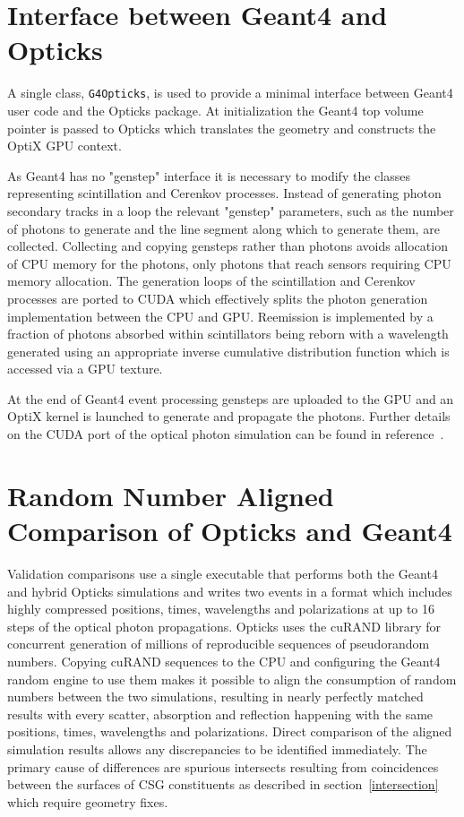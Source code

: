 \documentclass{webofc}
\begin{document}
\section{Interface between Geant4 and Opticks}
\label{simulation}
%
A single class, {\tt G4Opticks}, is used to provide a 
minimal interface between Geant4 user code and 
the Opticks package. 
At initialization the Geant4 top volume pointer is
passed to Opticks which translates the geometry and constructs 
the OptiX GPU context.

As Geant4 has no "genstep" interface it is necessary to modify the 
classes representing scintillation and Cerenkov processes.
Instead of generating photon secondary tracks in a loop the relevant "genstep" parameters, 
such as the number of photons to generate and the line segment along which to generate them, 
are collected. Collecting and copying gensteps rather than photons avoids allocation of CPU memory
for the photons, only photons that reach sensors requiring CPU memory allocation.
The generation loops of the scintillation and Cerenkov processes are ported to CUDA 
which effectively splits the photon generation implementation between the CPU and GPU.
Reemission is implemented by a fraction of photons absorbed within scintillators being 
reborn with a wavelength generated using an appropriate inverse cumulative distribution function
which is accessed via a GPU texture.

At the end of Geant4 event processing gensteps are uploaded to the GPU and an OptiX 
kernel is launched to generate and propagate the photons.
Further details on the CUDA port of the optical photon simulation can be found in reference~\cite{chep2016}.

%
\section{Random Number Aligned Comparison of Opticks and Geant4}
\label{validation}
%
Validation comparisons use a single executable that performs both
the Geant4 and hybrid Opticks simulations and writes two events in a format
which includes highly compressed positions, times, wavelengths and polarizations at up to 16 steps of the optical photon propagations.
Opticks uses the cuRAND\cite{curandURL} library for concurrent generation of millions of reproducible sequences of pseudorandom numbers.  
Copying cuRAND sequences to the CPU and configuring the Geant4 random engine to use them makes it possible to align the 
consumption of random numbers between the two simulations, resulting in nearly perfectly matched results with every scatter, 
absorption and reflection happening with the same positions, times, wavelengths and polarizations.
Direct comparison of the aligned simulation results allows any discrepancies to be identified immediately.
The primary cause of differences are spurious intersects resulting from coincidences between the surfaces
of CSG constituents as described in section~\ref{intersection} which require geometry fixes.
%
\end{document}
